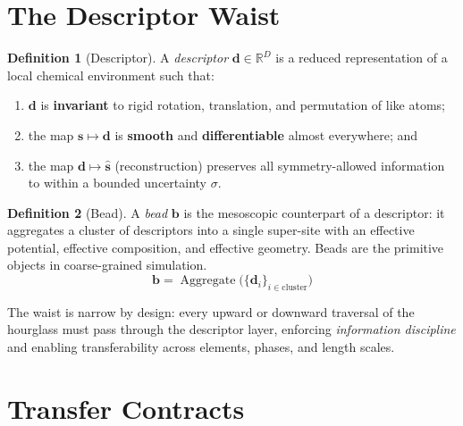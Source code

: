 \documentclass[11pt,a4paper]{article}
\theoremstyle{definition}
\newtheorem{definition}{Definition}[section]
\theoremstyle{plain}
\newcommand{\bead}{\boldsymbol{b}}
\newcommand{\desc}{\boldsymbol{d}}
\newcommand{\state}{\boldsymbol{s}}
\newcommand{\unc}{\sigma}
\begin{document}
\section{The Descriptor Waist}
\label{sec:waist}

\begin{definition}[Descriptor]
\label{def:descriptor}
A \emph{descriptor} $\desc \in \mathbb{R}^{D}$ is a reduced
representation of a local chemical environment such that:
\begin{enumerate}[label=(\alph*)]
  \item $\desc$ is \textbf{invariant} to rigid rotation, translation, and
        permutation of like atoms;
  \item the map $\state \mapsto \desc$ is \textbf{smooth} and
        \textbf{differentiable} almost everywhere; and
  \item the map $\desc \mapsto \hat{\state}$ (reconstruction) preserves
        all symmetry-allowed information to within a bounded
        uncertainty $\unc$.
\end{enumerate}
\end{definition}

\begin{definition}[Bead]
A \emph{bead} $\bead$ is the mesoscopic counterpart of a descriptor:
it aggregates a cluster of descriptors into a single super-site with
an effective potential, effective composition, and effective geometry.
Beads are the primitive objects in coarse-grained simulation.
\[
  \bead = \operatorname{Aggregate}\!\bigl(
    \{\desc_i\}_{i \in \text{cluster}}\bigr)
\]
\end{definition}

\noindent
The waist is narrow by design: every upward or downward traversal
of the hourglass must pass through the descriptor layer, enforcing
\emph{information discipline} and enabling transferability across
elements, phases, and length scales.


\section{Transfer Contracts}
\label{sec:contracts}
\end{document}
